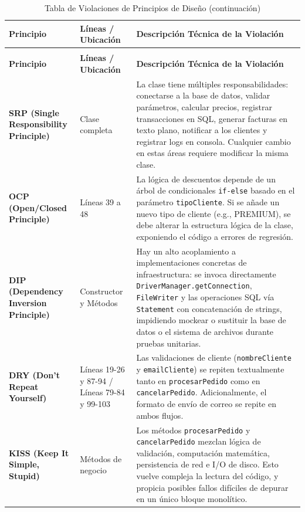 \documentclass[12pt, a4paper]{article}
\begin{document}
\begin{longtable}{p{3.5cm} p{2.2cm} p{9.3cm}}
\caption{Tabla de Violaciones de Principios de Diseño} \label{tab:violaciones} \\
\toprule
\textbf{Principio} & \textbf{Líneas / Ubicación} & \textbf{Descripción Técnica de la Violación} \\
\midrule
\endfirsthead
\caption[]{Tabla de Violaciones de Principios de Diseño (continuación)} \\
\toprule
\textbf{Principio} & \textbf{Líneas / Ubicación} & \textbf{Descripción Técnica de la Violación} \\
\midrule
\endhead
\bottomrule
\endfoot

\textbf{SRP (Single Responsibility Principle)} & Clase completa & La clase tiene múltiples responsabilidades: conectarse a la base de datos, validar parámetros, calcular precios, registrar transacciones en SQL, generar facturas en texto plano, notificar a los clientes y registrar logs en consola. Cualquier cambio en estas áreas requiere modificar la misma clase. \\
\midrule

\textbf{OCP (Open/Closed Principle)} & Líneas 39 a 48 & La lógica de descuentos depende de un árbol de condicionales \texttt{if-else} basado en el parámetro \texttt{tipoCliente}. Si se añade un nuevo tipo de cliente (e.g., PREMIUM), se debe alterar la estructura lógica de la clase, exponiendo el código a errores de regresión. \\
\midrule

\textbf{DIP (Dependency Inversion Principle)} & Constructor y Métodos & Hay un alto acoplamiento a implementaciones concretas de infraestructura: se invoca directamente \texttt{DriverManager.getConnection}, \texttt{FileWriter} y las operaciones SQL vía \texttt{Statement} con concatenación de strings, impidiendo mockear o sustituir la base de datos o el sistema de archivos durante pruebas unitarias. \\
\midrule

\textbf{DRY (Don't Repeat Yourself)} & Líneas 19-26 y 87-94 / Líneas 79-84 y 99-103 & Las validaciones de cliente (\texttt{nombreCliente} y \texttt{emailCliente}) se repiten textualmente tanto en \texttt{procesarPedido} como en \texttt{cancelarPedido}. Adicionalmente, el formato de envío de correo se repite en ambos flujos. \\
\midrule

\textbf{KISS (Keep It Simple, Stupid)} & Métodos de negocio & Los métodos \texttt{procesarPedido} y \texttt{cancelarPedido} mezclan lógica de validación, computación matemática, persistencia de red e I/O de disco. Esto vuelve compleja la lectura del código, y propicia posibles fallos difíciles de depurar en un único bloque monolítico. \\
\midrule


\end{longtable}
\end{document}
